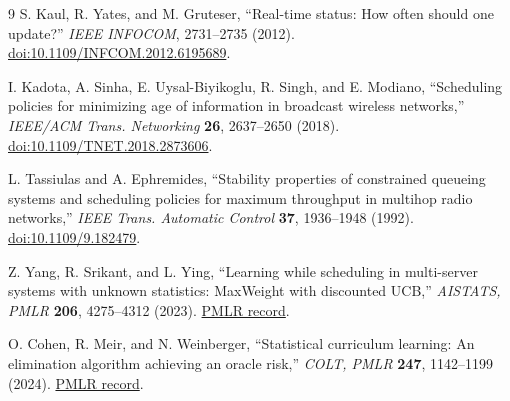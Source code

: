 \documentclass[10pt]{article}
\begin{document}
\begin{thebibliography}{9}
S. Kaul, R. Yates, and M. Gruteser,
``Real-time status: How often should one update?''
\emph{IEEE INFOCOM}, 2731--2735 (2012).
\href{https://doi.org/10.1109/INFCOM.2012.6195689}{doi:10.1109/INFCOM.2012.6195689}.

I. Kadota, A. Sinha, E. Uysal-Biyikoglu, R. Singh, and E. Modiano,
``Scheduling policies for minimizing age of information in broadcast wireless networks,''
\emph{IEEE/ACM Trans. Networking} \textbf{26}, 2637--2650 (2018).
\href{https://doi.org/10.1109/TNET.2018.2873606}{doi:10.1109/TNET.2018.2873606}.

L. Tassiulas and A. Ephremides,
``Stability properties of constrained queueing systems and scheduling policies for maximum throughput in multihop radio networks,''
\emph{IEEE Trans. Automatic Control} \textbf{37}, 1936--1948 (1992).
\href{https://doi.org/10.1109/9.182479}{doi:10.1109/9.182479}.

Z. Yang, R. Srikant, and L. Ying,
``Learning while scheduling in multi-server systems with unknown statistics: MaxWeight with discounted UCB,''
\emph{AISTATS, PMLR} \textbf{206}, 4275--4312 (2023).
\href{https://proceedings.mlr.press/v206/yang23d.html}{PMLR record}.

O. Cohen, R. Meir, and N. Weinberger,
``Statistical curriculum learning: An elimination algorithm achieving an oracle risk,''
\emph{COLT, PMLR} \textbf{247}, 1142--1199 (2024).
\href{https://proceedings.mlr.press/v247/cohen24a.html}{PMLR record}.
\end{thebibliography}
\end{document}
